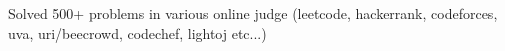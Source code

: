 \begin{zitemize}
\item Solved 500+ problems in various online judge (leetcode, hackerrank, codeforces, uva, uri/beecrowd, codechef, lightoj etc...)
\end{zitemize}